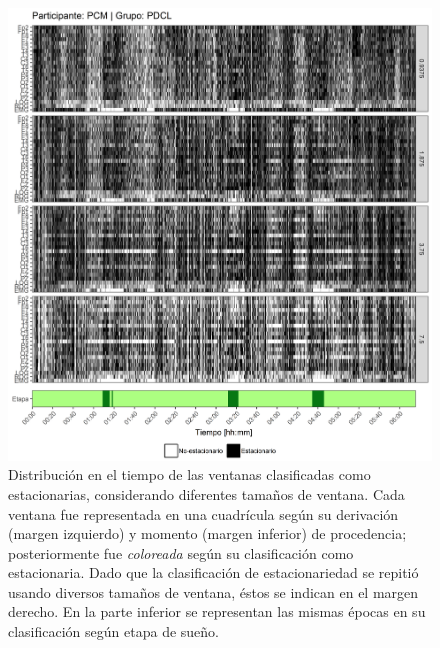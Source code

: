 \documentclass[12pt,letterpaper,draft]{book}
\begin{document}
\begin{figure}
\centering
\includegraphics[width=\linewidth]
{./scripts_graf_res/PCM_patrones_1.png}
\caption[Distribución en el tiempo de las ventanas clasificadas como estacionarias, considerando diferentes tamaños de ventana]{Distribución en el tiempo de las ventanas clasificadas como estacionarias, considerando diferentes tamaños de ventana. 
Cada ventana fue representada en una cuadrícula según su derivación (margen izquierdo) y momento (margen inferior) de procedencia; posteriormente fue \textit{coloreada} según su clasificación como estacionaria.
Dado que la clasificación de estacionariedad se repitió usando diversos tamaños de ventana, éstos se indican en el margen derecho.
En la parte inferior se representan las mismas épocas en su clasificación según etapa de sueño.}
\end{figure}
\end{document}
